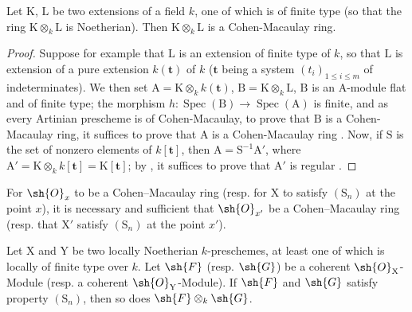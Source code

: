 \begin{lemma}[6.7.1.1]
\label{IV.6.7.1.1}
Let $\mathrm{K}$, $\mathrm{L}$ be two extensions of a field $k$, one of which is of finite type (so that the ring $\mathrm{K}\otimes_k\mathrm{L}$ is Noetherian). Then $\mathrm{K}\otimes_k\mathrm{L}$ is a Cohen-Macaulay ring.
\end{lemma}

\begin{proof}
Suppose for example that $\mathrm{L}$ is an extension of finite type of $k$, so that $\mathrm{L}$ is extension of a pure extension $k(\mathbf{t})$ of $k$ ($\mathbf{t}$ being a system $(t_i)_{1\leqslant i\leqslant m}$ of indeterminates). We then set $\mathrm{A}=\mathrm{K}\otimes_k k(\mathbf{t})$, $\mathrm{B}=\mathrm{K}\otimes_k\mathrm{L}$, $\mathrm{B}$ is an $\mathrm{A}$-module flat  and of finite type; the morphism $h:\operatorname{Spec}(\mathrm{B})\to\operatorname{Spec}(\mathrm{A})$ is finite, and as every Artinian prescheme is of Cohen-Macaulay, to prove that $\mathrm{B}$ is a Cohen-Macaulay ring, it suffices to prove that $\mathrm{A}$ is a Cohen-Macaulay ring . Now, if $\mathrm{S}$ is the set of nonzero elements of $k[\mathbf{t}]$, then $\mathrm{A}=\mathrm{S}^{-1}\mathrm{A}'$, where $\mathrm{A}'=\mathrm{K}\otimes_k k[\mathbf{t}]=\mathrm{K}[\mathbf{t}]$; by , it suffices to prove that $\mathrm{A}'$ is regular .
\end{proof}

\begin{corollary}[6.7.2]
\label{IV.6.7.2}
For $\sh{O}_x$ to be a Cohen--Macaulay ring (resp. for $\mathrm{X}$ to satisfy $(\mathrm{S}_n)$ at the point $x$), it is necessary and sufficient that $\sh{O}_{x'}$ be a Cohen--Macaulay ring (resp. that $\mathrm{X}'$ satisfy $(\mathrm{S}_n)$ at the point $x'$).
\end{corollary}

\begin{corollary}[6.7.3]
\label{IV.6.7.3}
Let $\mathrm{X}$ and $\mathrm{Y}$ be two locally Noetherian $k$-preschemes, at least one of which is locally of finite type over $k$. Let $\sh{F}$ (resp. $\sh{G}$) be a coherent $\sh{O}_{\mathrm{X}}$-Module (resp. a coherent $\sh{O}_{\mathrm{Y}}$-Module). If $\sh{F}$ and $\sh{G}$ satisfy property $(\mathrm{S}_n)$, then so does $\sh{F}\otimes_k\sh{G}$.
\end{corollary}

